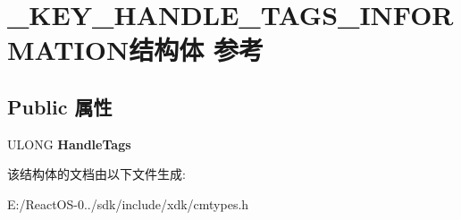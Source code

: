 \hypertarget{struct___k_e_y___h_a_n_d_l_e___t_a_g_s___i_n_f_o_r_m_a_t_i_o_n}{}\section{\+\_\+\+K\+E\+Y\+\_\+\+H\+A\+N\+D\+L\+E\+\_\+\+T\+A\+G\+S\+\_\+\+I\+N\+F\+O\+R\+M\+A\+T\+I\+O\+N结构体 参考}
\label{struct___k_e_y___h_a_n_d_l_e___t_a_g_s___i_n_f_o_r_m_a_t_i_o_n}
\subsection*{Public 属性}
\begin{DoxyCompactItemize}
\item 
\mbox{\label{struct___k_e_y___h_a_n_d_l_e___t_a_g_s___i_n_f_o_r_m_a_t_i_o_n_a6ad8bac112ede126a5eec93396b22fed}} 
U\+L\+O\+NG {\bfseries Handle\+Tags}
\end{DoxyCompactItemize}


该结构体的文档由以下文件生成\+:\begin{DoxyCompactItemize}
\item 
E\+:/\+React\+O\+S-\/0../sdk/include/xdk/cmtypes.\+h\end{DoxyCompactItemize}

